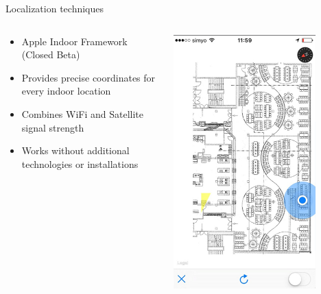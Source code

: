 \documentclass[11pt]{beamer}
\begin{document}
\begin{frame}[t]{Localization techniques}
  \begin{columns}[c]
    \begin{column}{0.7\textwidth}
      \begin{itemize}
        \item Apple Indoor Framework (Closed Beta)
        \item Provides precise coordinates for every indoor location
        \item Combines WiFi and Satellite signal strength
        \item Works without additional technologies or installations
      \end{itemize}
    \end{column}
    \hfill
    \begin{column}{0.3\textwidth}
      \includegraphics[width=0.8\textwidth]{appleframework}%
    \end{column}
  \end{columns}

\end{frame}
\end{document}
